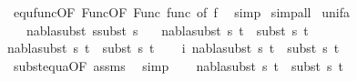 \begin{isabellebody}
\ equ{\isacharunderscore}{\kern0pt}func{\isacharbrackleft}{\kern0pt}OF\ Func{\isacharparenleft}{\kern0pt}{}{\isacharparenright}{\kern0pt}{\isacharbrackleft}{\kern0pt}OF\ Func{\isacharparenleft}{\kern0pt}{}{\isacharparenright}{\kern0pt}\ func{\isacharbrackright}{\kern0pt}{\isacharcomma}{\kern0pt}\ of\ f{\isacharbrackright}{\kern0pt}\ \isamarkupfalse%
\ simp\isanewline
{}\isamarkupfalse%
\ {\isacharparenleft}{\kern0pt}simp{\isacharunderscore}{\kern0pt}all{\isacharparenright}{\kern0pt}%
\endisatagproof
{\isafoldproof}%
%
\isadelimproof
\isanewline
%
\endisadelimproof
\isanewline
\isanewline
\isanewline
{}\isamarkupfalse%
\ unif{\isacharunderscore}{\kern0pt}{}a{\isacharcolon}{\kern0pt}\ \isanewline
\ \ \ {\isachardoublequoteopen}nabla{\isasymTurnstile}subst\ s{}{\isasymapprox}subst\ s{}{\isachardoublequoteclose}\isanewline
\ \ \ {\isachardoublequoteopen}{\isacharparenleft}{\kern0pt}nabla{\isasymturnstile}subst\ s{}\ t{}\ {\isasymapprox}\ subst\ s{}\ t{}{\isacharparenright}{\kern0pt}{\isachardoublequoteclose}\ \ \ \ \ \ \ \ \ \ \ \ \ \isanewline
{}nabla{\isasymturnstile}subst\ s{}\ t{}\ {\isasymapprox}\ subst\ s{}\ t{}{\isacharparenright}{\kern0pt}{\isachardoublequoteclose}\isanewline
%
\isadelimproof
%
\endisadelimproof
%
\isatagproof
{}\isamarkupfalse%
{\isacharminus}{\kern0pt}\isanewline
\ \ \isamarkupfalse%
\ i{\isacharcolon}{\kern0pt}\ {\isachardoublequoteopen}{\isacharparenleft}{\kern0pt}nabla{\isasymturnstile}subst\ s{}\ t{}\ {\isasymapprox}\ subst\ s{}\ t{}{\isacharparenright}{\kern0pt}{\isachardoublequoteclose}\isanewline
\ \ \ \ \isamarkupfalse%
\ subst{\isacharunderscore}{\kern0pt}equ{\isacharunderscore}{\kern0pt}a{\isacharbrackleft}{\kern0pt}OF\ assms{\isacharparenleft}{\kern0pt}{}{\isacharcomma}{\kern0pt}{}{\isacharparenright}{\kern0pt}{\isacharbrackright}{\kern0pt}\ \isamarkupfalse%
\ simp\isanewline
\ \ \isamarkupfalse%
\ {\isachardoublequoteopen}{\isacharparenleft}{\kern0pt}nabla{\isasymturnstile}subst\ s{}\ t{}\ {\isasymapprox}\ subst\ s{}\ t{}{\isacharparenright}{\kern0pt}{\isachardoublequoteclose}\isanewline
\ \ \ \ \isamarkupfalse%

\end{isabellebody}
